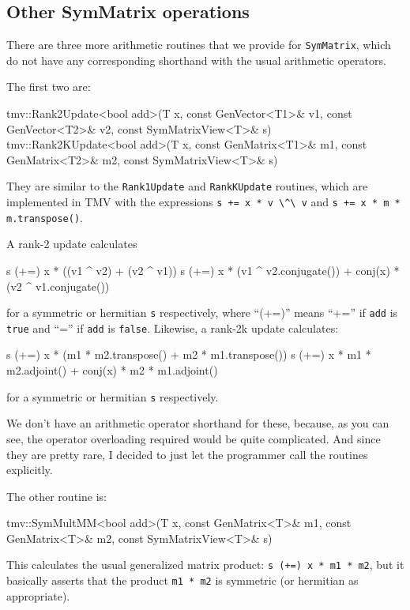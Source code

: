 \documentclass[twoside,letterpaper,11pt]{article}
\renewcommand{\tt}[1]{{\lstinline {#1}}}
\begin{document}
\subsection{Other SymMatrix operations}
\label{SymMatrix_Ops}

There are three more arithmetic routines that we provide for \tt{SymMatrix},
which do not have
any corresponding shorthand with the usual arithmetic operators.

The first two are:
\begin{tmvcode}
tmv::Rank2Update<bool add>(T x, const GenVector<T1>& v1, 
      const GenVector<T2>& v2, const SymMatrixView<T>& s)
tmv::Rank2KUpdate<bool add>(T x, const GenMatrix<T1>& m1, 
      const GenMatrix<T2>& m2, const SymMatrixView<T>& s)
\end{tmvcode}
They are similar to the \tt{Rank1Update} and \tt{RankKUpdate} routines,
which are implemented in TMV with the expressions 
\tt{s += x * v \^\ v} and \tt{s += x * m * m.transpose()}.

A rank-2 update calculates
\begin{tmvcode}
s (+=) x * ((v1 ^ v2) + (v2 ^ v1))
s (+=) x * (v1 ^ v2.conjugate()) + conj(x) * (v2 ^ v1.conjugate())
\end{tmvcode}
for a symmetric or hermitian \tt{s} respectively,
where ``(+=)'' means ``+='' if \tt{add} is \tt{true} and ``='' 
if \tt{add} is \tt{false}.
Likewise, a rank-2k update calculates:
\begin{tmvcode}
s (+=) x * (m1 * m2.transpose() + m2 * m1.transpose())
s (+=) x * m1 * m2.adjoint() + conj(x) * m2 * m1.adjoint()
\end{tmvcode}
for a symmetric or hermitian \tt{s} respectively.

We don't have an arithmetic operator 
shorthand for these, because, as you can see, the operator
overloading required would be quite complicated.  
And since they are pretty rare, I decided to just let the programmer 
call the routines explicitly.

The other routine is:
\begin{tmvcode}
tmv::SymMultMM<bool add>(T x, const GenMatrix<T>& m1, 
      const GenMatrix<T>& m2, const SymMatrixView<T>& s)
\end{tmvcode}
This calculates the usual generalized matrix product:
\tt{s (+=) x * m1 * m2}, but it basically
asserts that the product \tt{m1 * m2} is symmetric (or hermitian as appropriate).
\end{document}
